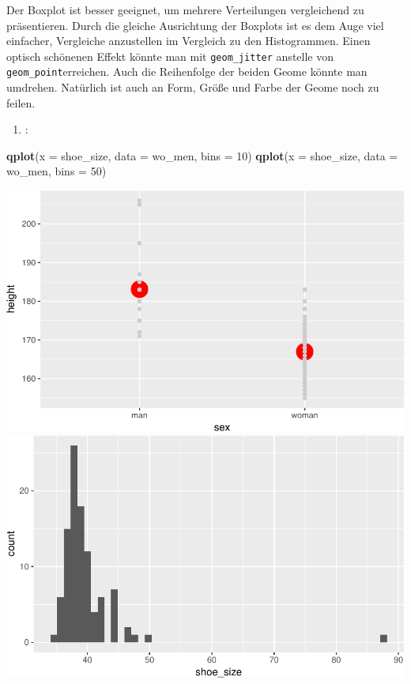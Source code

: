 \documentclass[12pt,ngerman,]{book}
\newenvironment{Shaded}{\begin{snugshade}}{\end{snugshade}}
\newcommand{\KeywordTok}[1]{\textcolor[rgb]{0.13,0.29,0.53}{\textbf{{#1}}}}
\newcommand{\DataTypeTok}[1]{\textcolor[rgb]{0.13,0.29,0.53}{{#1}}}
\newcommand{\DecValTok}[1]{\textcolor[rgb]{0.00,0.00,0.81}{{#1}}}
\newcommand{\NormalTok}[1]{{#1}}
\providecommand{\tightlist}{%
  \setlength{\itemsep}{0pt}\setlength{\parskip}{0pt}}
\renewenvironment{Shaded}{\begin{kframe}}{\end{kframe}}
\begin{document}
Der Boxplot ist besser geeignet, um mehrere Verteilungen vergleichend zu
präsentieren. Durch die gleiche Ausrichtung der Boxplots ist es dem Auge
viel einfacher, Vergleiche anzustellen im Vergleich zu den Histogrammen.
Einen optisch schönenen Effekt könnte man mit \texttt{geom\_jitter}
anstelle von \texttt{geom\_point}erreichen. Auch die Reihenfolge der
beiden Geome könnte man umdrehen. Natürlich ist auch an Form, Größe und
Farbe der Geome noch zu feilen.

\begin{enumerate}
\def\labelenumi{\arabic{enumi}.}
\setcounter{enumi}{2}
\tightlist
\item
  :
\end{enumerate}

\begin{Shaded}
\begin{Highlighting}[]
\KeywordTok{qplot}\NormalTok{(}\DataTypeTok{x =} \NormalTok{shoe_size, }\DataTypeTok{data =} \NormalTok{wo_men, }\DataTypeTok{bins =} \DecValTok{10}\NormalTok{)}
\KeywordTok{qplot}\NormalTok{(}\DataTypeTok{x =} \NormalTok{shoe_size, }\DataTypeTok{data =} \NormalTok{wo_men, }\DataTypeTok{bins =} \DecValTok{50}\NormalTok{)}
\end{Highlighting}
\end{Shaded}

\begin{center}\includegraphics[width=0.7\linewidth]{050_Daten_visualisieren_files/figure-latex/unnamed-chunk-32-1} \includegraphics[width=0.7\linewidth]{050_Daten_visualisieren_files/figure-latex/unnamed-chunk-32-2} \end{center}
\end{document}
